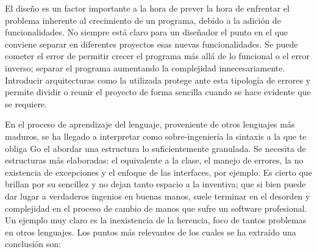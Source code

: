 El diseño es un factor importante a la hora de prever la hora de enfrentar el problema inherente al crecimiento de un programa, debido a la adición de funcionalidades.
No siempre está claro para un diseñador el punto en el que conviene separar en diferentes proyectos esas nuevas funcionalidades.
Se puede cometer el error de permitir crecer el programa más allá de lo funcional o el error inverso; separar el programa aumentando la complejidad innecesariamente.
Introducir arquitecturas como la utilizada protege ante esta tipología de errores y permite dividir o reunir el proyecto de forma sencilla cuando se hace evidente que se requiere.

En el proceso de aprendizaje del lenguaje, proveniente de otros lenguajes más maduros, se ha llegado a interpretar como sobre-ingeniería la sintaxis a la que te obliga Go el abordar una estructura lo suficientemente granulada.
Se necesita de estructuras más elaboradas: el equivalente a la clase, el manejo de errores, la no existencia de excepciones y el enfoque de las interfaces, por ejemplo.
Es cierto que brillan por su sencillez y no dejan tanto espacio a la inventiva;
que si bien puede dar lugar a verdaderos ingenios en buenas manos, suele terminar en el desorden y complejidad en el proceso de cambio de manos que sufre un software profesional.
Un ejemplo muy claro es la inexistencia de la herencia, foco de tantos problemas en otros lenguajes.
Los puntos más relevantes de los cuales se ha extraído una conclusión son:

